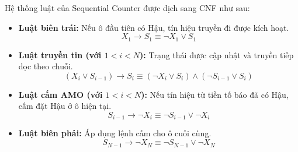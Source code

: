 \documentclass[a4paper,fleqn,numbers]{cas-sc}
\begin{document}
    Hệ thống luật của Sequential Counter được dịch sang CNF như sau:
    \begin{itemize}
        \item \textbf{Luật biên trái:} Nếu ô đầu tiên có Hậu, tín hiệu truyền đi được kích hoạt.
        \begin{equation}\label{eq:seq_left}
            X_1 \to S_1 \equiv \neg X_1 \lor S_1
        \end{equation}

        \item \textbf{Luật truyền tin (với $1 < i < N$):} Trạng thái được cập nhật và truyền tiếp dọc theo chuỗi.
        \begin{equation}\label{eq:seq_mid_prop}
            (X_i \lor S_{i-1}) \to S_i \equiv (\neg X_i \lor S_i) \land (\neg S_{i-1} \lor S_i)
        \end{equation}

        \item \textbf{Luật cấm AMO (với $1 < i < N$):} Nếu tín hiệu từ tiền tố báo đã có Hậu, cấm đặt Hậu ở ô hiện tại.
        \begin{equation}\label{eq:seq_mid_ban}
            S_{i-1} \to \neg X_i \equiv \neg S_{i-1} \lor \neg X_i
        \end{equation}

        \item \textbf{Luật biên phải:} Áp dụng lệnh cấm cho ô cuối cùng.
        \begin{equation}\label{eq:seq_right}
            S_{N-1} \to \neg X_N \equiv \neg S_{N-1} \lor \neg X_N
        \end{equation}
    \end{itemize}
\end{document}
